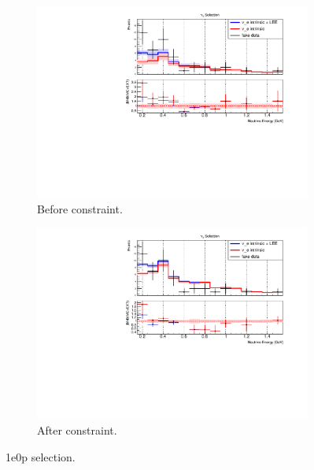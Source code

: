 \begin{figure}[H] 
\begin{center}
    \begin{subfigure}[b]{0.45\textwidth}
    \centering
    \includegraphics[width=1.00\textwidth]{Fakedata/set5/1e0p_numu_reco_e_H1_mc_fakedata_set5_nue_before_data_constraint.pdf}
    \caption{\label{fig:fakedata:set5:zp_before_constrain} Before constraint.}
    \end{subfigure}
    \begin{subfigure}[b]{0.45\textwidth}
    \centering
    \includegraphics[width=1.00\textwidth]{Fakedata/set5/1e0p_numu_reco_e_H1_mc_fakedata_set5_univ_overlay_nue.pdf}
    \caption{\label{fig:fakedata:set5:zp_after_constrain} After constraint.}
    \end{subfigure}
\caption{\label{fig:fakedata:set5:zp_const} 1e0p selection.}
\end{center}
\end{figure}

